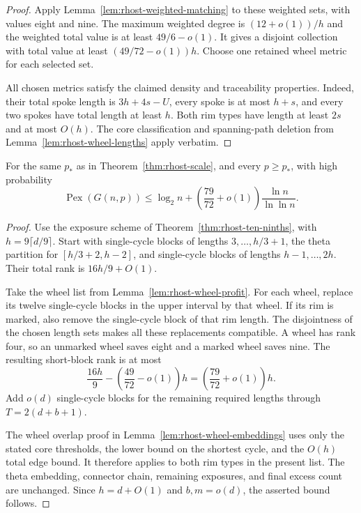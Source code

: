 \begin{proof}
Apply Lemma~\ref{lem:rhost-weighted-matching} to these weighted sets, with values eight and nine.
The maximum weighted degree is $(12+o(1))/h$ and the weighted total value is at least $49/6-o(1)$.
It gives a disjoint collection with total value at least $(49/72-o(1))h$.
Choose one retained wheel metric for each selected set.

All chosen metrics satisfy the claimed density and traceability properties.
Indeed, their total spoke length is $3h+4s-U$, every spoke is at most $h+s$,
and every two spokes have total length at least $h$.
Both rim types have length at least $2s$ and at most $O(h)$.
The core classification and spanning-path deletion from Lemma~\ref{lem:rhost-wheel-lengths} apply verbatim.
\end{proof}

\begin{theorem}\label{thm:rhost-seventy-nine}
For the same $p_*$ as in Theorem~\ref{thm:rhost-scale}, and every $p\ge p_*$,
with high probability
\[
 \operatorname{Pex}(G(n,p))
 \le\log_2n+\left(\frac{79}{72}+o(1)\right)\frac{\ln n}{\ln\ln n}.
\]
\end{theorem}

\begin{proof}
Use the exposure scheme of Theorem~\ref{thm:rhost-ten-ninths}, with $h=9\lceil d/9\rceil$.
Start with single-cycle blocks of lengths $3,\ldots,h/3+1$,
the theta partition for $[h/3+2,h-2]$, and single-cycle blocks of lengths $h-1,\ldots,2h$.
Their total rank is $16h/9+O(1)$.

Take the wheel list from Lemma~\ref{lem:rhost-wheel-profit}.
For each wheel, replace its twelve single-cycle blocks in the upper interval by that wheel.
If its rim is marked, also remove the single-cycle block of that rim length.
The disjointness of the chosen length sets makes all these replacements compatible.
A wheel has rank four, so an unmarked wheel saves eight and a marked wheel saves nine.
The resulting short-block rank is at most
\[
 \frac{16h}9-\left(\frac{49}{72}-o(1)\right)h
 =\left(\frac{79}{72}+o(1)\right)h.
\]
Add $o(d)$ single-cycle blocks for the remaining required lengths through $T=2(d+b+1)$.

The wheel overlap proof in Lemma~\ref{lem:rhost-wheel-embeddings} uses only the stated core thresholds,
the lower bound on the shortest cycle, and the $O(h)$ total edge bound.
It therefore applies to both rim types in the present list.
The theta embedding, connector chain, remaining exposures, and final excess count are unchanged.
Since $h=d+O(1)$ and $b,m=o(d)$, the asserted bound follows.
\end{proof}
